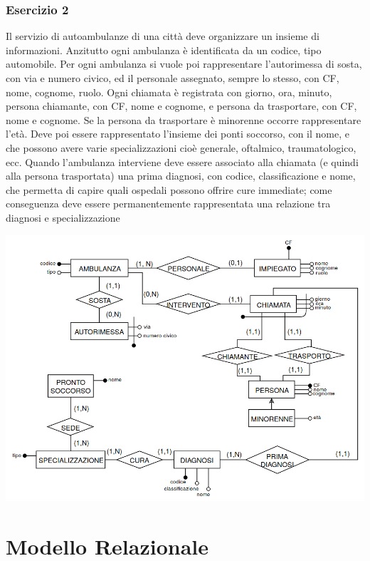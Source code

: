 \documentclass[a4paper]{article}
\begin{document}
\subsubsection{Esercizio 2}
Il servizio di autoambulanze di una città deve organizzare un insieme di informazioni. Anzitutto ogni ambulanza è identificata da un codice, tipo automobile. Per ogni ambulanza si vuole poi rappresentare l'autorimessa di sosta, con via e numero civico, ed il personale assegnato, sempre lo stesso, con CF, nome, cognome, ruolo. Ogni chiamata è registrata con giorno, ora, minuto, persona chiamante, con CF, nome e cognome, e persona da trasportare, con CF, nome e cognome. Se la persona da trasportare è minorenne occorre rappresentare l'età. Deve poi essere rappresentato l'insieme dei ponti soccorso, con il nome, e che possono avere varie specializzazioni cioè generale, oftalmico, traumatologico, ecc. Quando l'ambulanza interviene deve essere associato alla chiamata (e quindi alla persona trasportata) una prima diagnosi, con codice, classificazione e nome, che permetta di capire quali ospedali possono offrire cure immediate; come conseguenza deve essere permanentemente rappresentata una relazione tra diagnosi e specializzazione
\begin{center}
      \includegraphics[scale=0.4]{img/er7.png}
\end{center}
\section{Modello Relazionale}
\end{document}
